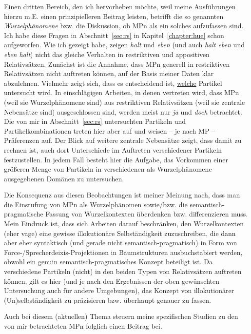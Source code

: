 \noindent
Einen dritten Bereich, den ich hervorheben möchte, weil meine Ausführungen hierzu m.E. einen prinzipielleren Beitrag leisten, betrifft die so genannten \textit{Wurzel\-phänomene}  bzw. die Diskussion, ob MPn als ein solches aufzufassen sind. Ich habe diese Fragen in Abschnitt~\ref{sec:rs} in Kapitel~\ref{chapter:hue} schon aufgeworfen. Wie ich gezeigt habe, zeigen \textit{halt} und \textit{eben} (und auch \textit{halt eben} und \textit{eben halt}) nicht das gleiche Verhalten in restriktiven und appositiven Relativsätzen. Zunächst ist die Annahme, dass MPn generell in restriktiven Relativsätzen nicht auftreten können, auf der Basis meiner Daten klar abzulehnen. Vielmehr zeigt sich, dass es entscheidend ist, \underline{welche} Partikel untersucht wird. In einschlägigen Arbeiten, in denen vertreten wird, dass MPn (weil sie Wurzelphänomene sind) aus restriktiven Relativsätzen (weil sie zentrale Nebensätze  sind) ausgeschlossen sind, werden meist nur \textit{ja} und \textit{doch} betrachtet. Die von mir in Abschnitt~\ref{sec:rs} untersuchten Partikeln und Partikelkombinationen treten hier aber auf und weisen – je nach MP – Präferenzen auf. Der Blick auf weitere zentrale Nebensätze zeigt, dass damit zu rechnen ist, auch dort Unterschiede im Auftreten verschiedener Partikeln festzustellen. In jedem Fall besteht hier die Aufgabe, das Vorkommen einer größeren Menge von Partikeln in verschiedenen als Wurzelphänomene ausgegebenen Domänen zu untersuchen.

Die Konsequenz aus diesen Beobachtungen ist meiner Meinung nach, dass man die Einstufung von MPn als Wurzelphänomen sowie/bzw. die semantisch-pragmatische Fassung von Wurzelkontexten überdenken bzw. differenzieren muss. Mein Eindruck ist, dass sich Arbeiten darauf beschränken, den Wurzelkontexten (eher vage) eine gewisse illokutionäre Selbständigkeit zuzuschreiben, die dann aber eher syntaktisch (und gerade nicht semantisch-pragmatisch) in Form von Force-/Sprecherdeixis-Projektionen in Baumstrukturen ausbuchstabiert werden, obwohl ein genuin semantisch-pragmatisches Konzept beteiligt ist. Da verschiedene Partikeln (nicht) in den beiden Typen von Relativsätzen auftreten können, gilt es hier (und je nach den Ergebnissen der oben gewünschten Untersuchung auch für andere Umgebungen), das Konzept von \glq illokutionärer (Un)selb\-ständigkeit\grq {} zu präzisieren bzw. überhaupt genauer zu fassen. 
	
Auch bei diesem (aktuellen) Thema steuern meine spezifischen Studien zu den von mir betrachteten MPn folglich einen Beitrag bei.\\

